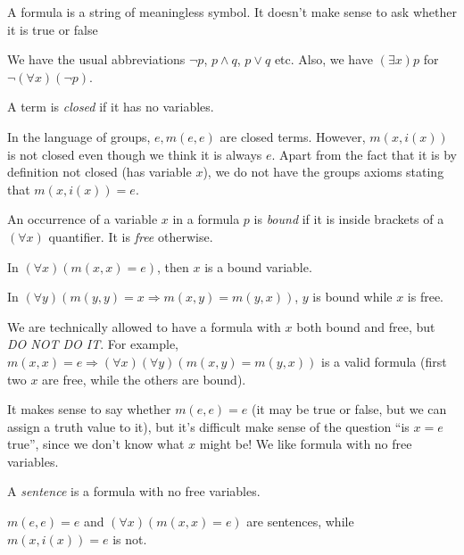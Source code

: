 \documentclass[a4paper]{article}
\begin{document}
\note A formula is a string of meaningless symbol. It doesn't make sense to ask whether it is true or false

\note We have the usual abbreviations $\neg p$, $p\wedge q$, $p\vee q$ etc.  Also, we have $(\exists x)p$ for $\neg(\forall x)(\neg p)$.

\begin{defi}
  A term is \emph{closed} if it has no variables.
\end{defi}

\begin{eg}
  In the language of groups, $e, m(e, e)$ are closed terms. However, $m(x, i(x))$ is not closed even though we think it is always $e$. Apart from the fact that it is by definition not closed (has variable $x$), we do not have the groups axioms stating that $m(x, i(x)) = e$.
\end{eg}

\begin{defi}
  An occurrence of a variable $x$ in a formula $p$ is \emph{bound} if it is inside brackets of a $(\forall x)$ quantifier. It is \emph{free} otherwise.
\end{defi}

\begin{eg}
  In $(\forall x)(m(x, x) = e)$, then $x$ is a bound variable.

  In $(\forall y)(m(y, y) = x \Rightarrow m(x, y) = m(y, x))$, $y$ is bound while $x$ is free.

  We are technically allowed to have a formula with $x$ both bound and free, but \emph{DO NOT DO IT}. For example, $m(x, x) = e \Rightarrow (\forall x)(\forall y)(m(x, y) = m(y, x))$ is a valid formula (first two $x$ are free, while the others are bound).
\end{eg}

It makes sense to say whether $m(e, e) = e$ (it may be true or false, but we can assign a truth value to it), but it's difficult make sense of the question ``is $x = e$ true'', since we don't know what $x$ might be! We like formula with no free variables.

\begin{defi}[Sentence]
  A \emph{sentence} is a formula with no free variables.
\end{defi}

\begin{eg}
  $m(e, e) = e$ and $(\forall x)(m(x, x) = e)$ are sentences, while $m(x, i(x)) = e$ is not.
\end{eg}
\end{document}
